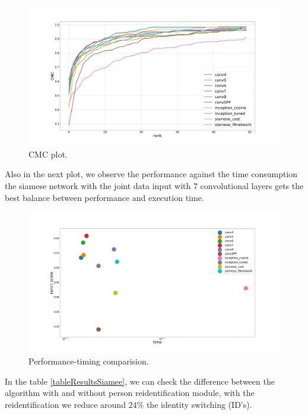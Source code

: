 \begin{figure}[hptb]
\centering         
\includegraphics[width=12cm]{siameseDev/cmcNetwors.png}
\caption{CMC plot.} \label{lossesSiam2}
\end{figure}

Also in the next plot, we observe the performance against the time consumption the siamese network with the joint data input with $7$ convolutional layers gets the best balance between performance and execution time. 

\begin{figure}[hptb]
\centering         
\includegraphics[width=12cm]{siameseDev/results.png}
\caption{Performance-timing comparision.} \label{lossesSiam3}
\end{figure}




In the table \ref{tableResultsSiamee}, we can check the difference between the algorithm with and without person reidentification module, with the reidentification we reduce around $24 \%$ the identity switching (ID's).


